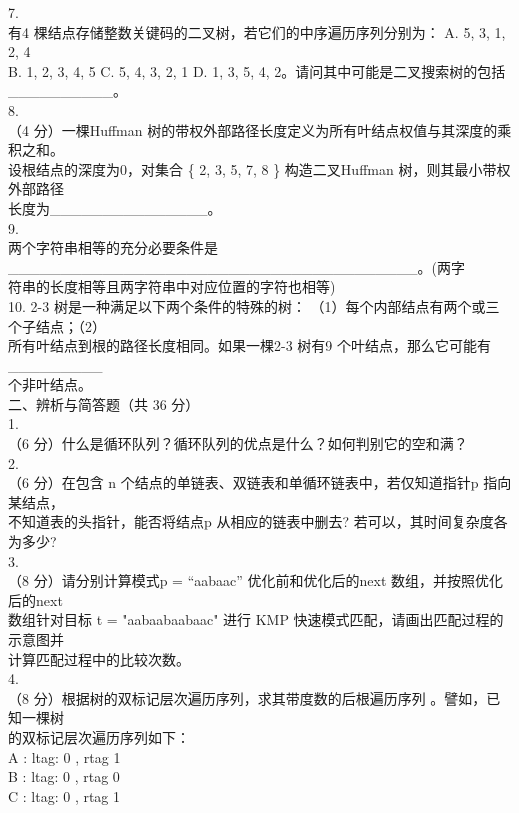 \begin{question}
7.\\
有4 棵结点存储整数关键码的二叉树，若它们的中序遍历序列分别为：   A.  5, 3, 1, 2, 4\\
B.  1, 2, 3, 4, 5    C.   5, 4, 3, 2, 1   D.   1, 3, 5, 4, 2。请问其中可能是二叉搜索树的包括\\
\_\_\_\_\_\_\_\_\_\_。\\
8.\\
（4 分）一棵Huffman 树的带权外部路径长度定义为所有叶结点权值与其深度的乘积之和。\\
设根结点的深度为0，对集合 \{ 2, 3, 5, 7, 8 \} 构造二叉Huffman 树，则其最小带权外部路径\\
长度为\_\_\_\_\_\_\_\_\_\_\_\_\_\_\_。\\
9.\\
两个字符串相等的充分必要条件是   \_\_\_\_\_\_\_\_\_\_\_\_\_\_\_\_\_\_\_\_\_\_\_\_\_\_\_\_\_\_\_\_\_\_\_\_\_\_\_。(两字\\
符串的长度相等且两字符串中对应位置的字符也相等)\\
10. 2-3 树是一种满足以下两个条件的特殊的树： （1）每个内部结点有两个或三个子结点；（2）\\
所有叶结点到根的路径长度相同。如果一棵2-3 树有9 个叶结点，那么它可能有\_\_\_\_\_\_\_\_\_\\
个非叶结点。\\
二、辨析与简答题（共 36 分）\\
1.\\
（6 分）什么是循环队列？循环队列的优点是什么？如何判别它的空和满？\\
2.\\
（6 分）在包含 n 个结点的单链表、双链表和单循环链表中，若仅知道指针p 指向某结点，\\
不知道表的头指针，能否将结点p 从相应的链表中删去? 若可以，其时间复杂度各为多少?\\
3.\\
（8 分）请分别计算模式p = “aabaac” 优化前和优化后的next 数组，并按照优化后的next\\
数组针对目标 t = "aabaabaabaac" 进行 KMP 快速模式匹配，请画出匹配过程的示意图并\\
计算匹配过程中的比较次数。\\
4.\\
（8 分）根据树的双标记层次遍历序列，求其带度数的后根遍历序列 。譬如，已知一棵树\\
的双标记层次遍历序列如下：\\
A : ltag: 0 , rtag 1\\
B : ltag: 0 , rtag 0\\
C : ltag: 0 , rtag 1\\

\end{question}
